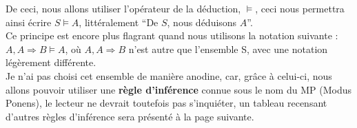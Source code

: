 \documentclass[a4paper, 12pt]{article}
\newcommand{\imply}{\Rightarrow}
\numberwithin{equation}{subsection}
\begin{document}
    De ceci, nous allons utiliser l'opérateur de la déduction, $\vDash$, ceci nous permettra ainsi écrire $S \vDash A$, littéralement ``De $S$, nous déduisons $A$''. \\

    Ce principe est encore plus flagrant quand nous utilisons la notation suivante : $A, A \imply B \models A$, où $A, A \imply B$ n'est autre que l'ensemble S, avec une notation légèrement différente. \\

    Je n'ai pas choisi cet ensemble de manière anodine, car, grâce à celui-ci, nous allons pouvoir utiliser une {\bf règle d'inférence} connue sous le nom du MP (Modus Ponens), le lecteur ne devrait toutefois pas s'inquiéter, un tableau recensant d'autres règles d'inférence sera présenté à la page suivante. \\
\end{document}
